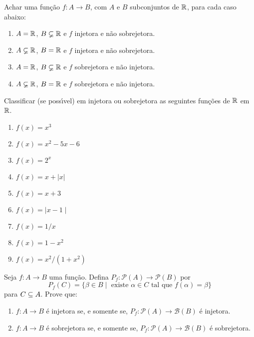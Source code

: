 \documentclass[12pt]{exam}
\begin{document}
    \questao{} Achar uma fun{\c c}{\~a}o $f : A \to B$, com $A$ e $B$ subconjuntos de $\mathbb{R}$, para cada caso abaixo:
    \begin{enumerate}[label={\alph*})]
        \item $A = \mathbb{R}$, $B \varsubsetneq \mathbb{R}$ e $f$ injetora e n{\~a}o sobrejetora.

        \item $A \varsubsetneq \mathbb{R}$, $B = \mathbb{R}$ e $f$ injetora e n{\~a}o sobrejetora.

        \item $A = \mathbb{R}$, $B \varsubsetneq \mathbb{R}$ e $f$ sobrejetora e n{\~a}o injetora.

        \item $A \varsubsetneq \mathbb{R}$, $B = \mathbb{R}$ e $f$ sobrejetora e n{\~a}o injetora.
    \end{enumerate}

    \newpage

    \questao{} Classificar (se poss{\'\i}vel) em injetora ou sobrejetora as seguintes fun{\c c}{\~o}es de $\mathbb{R}$ em $\mathbb{R}$.

    \begin{multicols}{2}
        \begin{enumerate}[label={\alph*})]
            \item $f(x) = x^3$

            \item $f(x) = x^2 - 5x - 6$

            \item $f(x) = 2^x$

            \item $f(x) = x + | x |$

            \item $f(x) = x + 3$

            \item $f(x) = \mid x - 1\mid$

            \item $f(x) = 1/x$

            \item $f(x) = 1 - x^2$

            \item $f(x) = x^2/(1 + x^2)$
        \end{enumerate}
    \end{multicols}

    \vspace{.3cm}

    \questao{} Seja $f : A \to B$ uma função. Defina $P_f : \mathcal{P}(A) \to \mathcal{P}(B)$ por
    \[
        P_f(C) = \{\beta \in B \mid \mbox{ existe } \alpha \in C \mbox{ tal que } f(\alpha) = \beta\}
    \]
    para $C \subseteq A$. Prove que:
    \begin{enumerate}[label={\roman*})]

        \item $f : A \to B$ é injetora se, e somente se, $P_f : \mathcal{P}(A) \to \mathcal{B}(B)$ é injetora.

        \item $f : A \to B$ é sobrejetora se, e somente se, $P_f : \mathcal{P}(A) \to \mathcal{B}(B)$ é sobrejetora.
    \end{enumerate}
\end{document}
